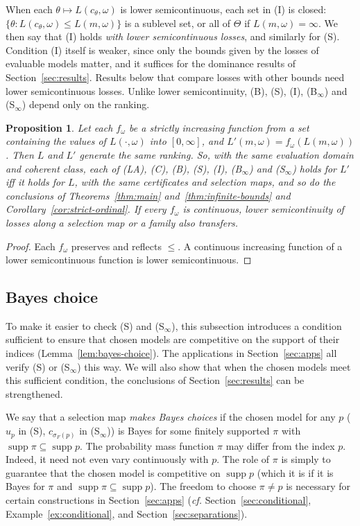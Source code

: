 \documentclass[11pt]{article}
\newtheorem{proposition}[theorem]{Proposition}
\theoremstyle{definition}
\theoremstyle{remark}
\newcommand{\supp}{\operatorname{supp}}
\begin{document}
When each $\theta\mapsto L(c_\theta,\omega)$ is lower semicontinuous, each set in (I) is closed: $\{\theta:L(c_\theta,\omega)\le L(m,\omega)\}$ is a sublevel set, or all of $\Theta$ if $L(m,\omega)=\infty$. We then say that (I) holds \emph{with lower semicontinuous losses}, and similarly for (S). Condition (I) itself is weaker, since only the bounds given by the losses of evaluable models matter, and it suffices for the dominance results of Section~\ref{sec:results}. Results below that compare losses with other bounds need lower semicontinuous losses. Unlike lower semicontinuity, (B), (S), (I), (B$_\infty$) and (S$_\infty$) depend only on the ranking.
\begin{proposition}\label{prop:ordinal}
Let each $f_\omega$ be a strictly increasing function from a set containing the values of $L(\cdot,\omega)$ into $[0,\infty]$, and $L'(m,\omega)=f_\omega(L(m,\omega))$. Then $L$ and $L'$ generate the same ranking. So, with the same evaluation domain and coherent class, each of (LA), (C), (B), (S), (I), (B$_\infty$) and (S$_\infty$) holds for $L'$ iff it holds for $L$, with the same certificates and selection maps, and so do the conclusions of Theorems~\ref{thm:main} and~\ref{thm:infinite-bounds} and Corollary~\ref{cor:strict-ordinal}. If every $f_\omega$ is continuous, lower semicontinuity of losses along a selection map or a family also transfers.
\end{proposition}
\begin{proof}
Each $f_\omega$ preserves and reflects $\le$. A continuous increasing function of a lower semicontinuous function is lower semicontinuous.
\end{proof}

\subsection{Bayes choice}\label{sec:bayes}

To make it easier to check (S) and (S$_\infty$), this subsection introduces a condition sufficient to ensure that chosen models are competitive on the support of their indices (Lemma~\ref{lem:bayes-choice}). The applications in Section~\ref{sec:apps} all verify (S) or (S$_\infty$) this way. We will also show that when the chosen models meet this sufficient condition, the conclusions of Section~\ref{sec:results} can be strengthened.



We say that a selection map \emph{makes Bayes choices} if the chosen model for any $p$ ($u_p$ in (S), $c_{\sigma_F(p)}$ in (S$_\infty$)) is Bayes for some finitely supported $\pi$ with $\supp\pi\subseteq\supp p$. The probability mass function $\pi$ may differ from the index $p$. Indeed, it need not even vary continuously with $p$. The role of $\pi$ is simply to guarantee that the chosen model is competitive on $\supp p$ (which it is if it is Bayes for $\pi$ and $\supp\pi\subseteq\supp p$). The freedom to choose $\pi\ne p$ is necessary for certain constructions in Section~\ref{sec:apps} (\textit{cf.} Section~\ref{sec:conditional}, Example~\ref{ex:conditional}, and Section~\ref{sec:separations}).
\end{document}
